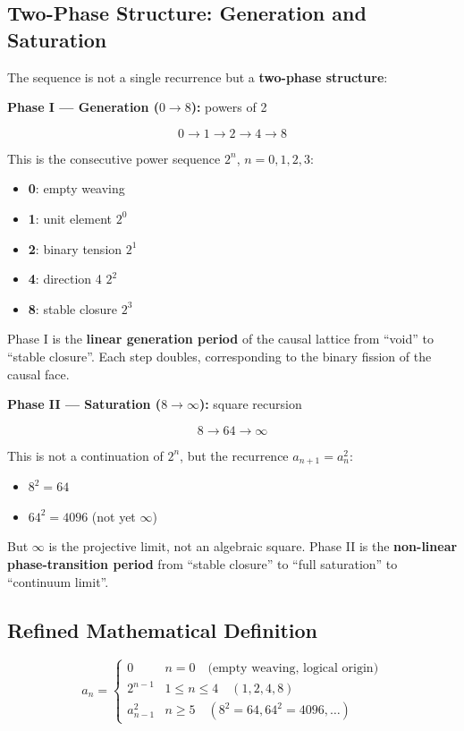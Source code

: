 \documentclass[aps,prd,twocolumn,nofootinbib,floatfix]{revtex4-2}
\begin{document}
\subsection{Two-Phase Structure: Generation and Saturation}

The sequence is not a single recurrence but a \textbf{two-phase structure}:

\textbf{Phase I --- Generation ($0 \to 8$):} powers of 2

\[
0 \to 1 \to 2 \to 4 \to 8
\]

This is the consecutive power sequence $2^n$, $n = 0, 1, 2, 3$:
\begin{itemize}
    \item \textbf{0}: empty weaving
    \item \textbf{1}: unit element $2^0$
    \item \textbf{2}: binary tension $2^1$
    \item \textbf{4}: direction 4 $2^2$
    \item \textbf{8}: stable closure $2^3$
\end{itemize}

Phase I is the \textbf{linear generation period} of the causal lattice from ``void'' to ``stable closure''. Each step doubles, corresponding to the binary fission of the causal face.

\textbf{Phase II --- Saturation ($8 \to \infty$):} square recursion

\[
8 \to 64 \to \infty
\]

This is not a continuation of $2^n$, but the recurrence $a_{n+1} = a_n^2$:
\begin{itemize}
    \item $8^2 = 64$
    \item $64^2 = 4096$ (not yet $\infty$)
\end{itemize}

But $\infty$ is the projective limit, not an algebraic square. Phase II is the \textbf{non-linear phase-transition period} from ``stable closure'' to ``full saturation'' to ``continuum limit''.

\subsection{Refined Mathematical Definition}

\[
\boxed{
a_n =
\begin{cases}
0 & n = 0 \quad \text{(empty weaving, logical origin)} \\
2^{n-1} & 1 \le n \le 4 \quad (1, 2, 4, 8) \\
a_{n-1}^2 & n \ge 5 \quad (8^2 = 64, 64^2 = 4096, \dots)
\end{cases}
}
\]
\end{document}
